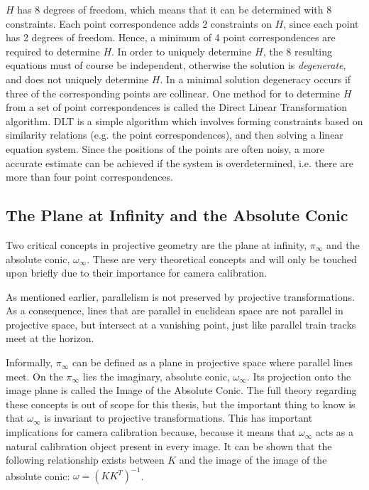 $H$ has 8 degrees of freedom, which means that it can be determined with 8 constraints. Each point correspondence adds 2 constraints on $H$, since each point has 2 degrees of freedom.
Hence, a minimum of 4 point correspondences are required to determine $H$.
In order to uniquely determine $H$, the 8 resulting equations must of course be independent, otherwise the solution is \textit{degenerate}, and does not uniquely determine $H$.
In a minimal solution degeneracy occurs if three of the corresponding points are collinear. \cite[91-92]{hartley-zisserman} %
One method for to determine $H$ from a set of point correspondences is called the Direct Linear Transformation algorithm.
DLT is a simple algorithm which involves forming constraints based on similarity relations (e.g. the point correspondences), and then solving a linear equation system.
Since the positions of the points are often noisy, a more accurate estimate can be achieved if the system is overdetermined, i.e. there are more than four point correspondences.
\cite{homography-estimation}

\subsection{The Plane at Infinity and the Absolute Conic} \label{ac}
Two critical concepts in projective geometry are the plane at infinity, $\pi_{\infty}$ and the absolute conic, $\omega_{\infty}$.
These are very theoretical concepts and will only be touched upon briefly due to their importance for camera calibration.

As mentioned earlier, parallelism is not preserved by projective transformations. %
As a consequence, lines that are parallel in euclidean space are not parallel in projective space, but intersect at a vanishing point, just like parallel train tracks meet at the horizon.

Informally, $\pi_{\infty}$ can be defined as a plane in projective space where parallel lines meet. 
On the $\pi_{\infty}$ lies the imaginary, absolute conic, $\omega_{\infty}$.
Its projection onto the image plane is called the Image of the Absolute Conic.
The full theory regarding these concepts is out of scope for this thesis, but the important thing to know is that $\omega_{\infty}$ is invariant to projective transformations.
This has important implications for camera calibration because, because it means that $\omega_{\infty}$ acts as a natural calibration object present in every image.
It can be shown that the following relationship exists between $K$ and the image of the image of the absolute conic:
$\omega = (KK^T)^{-1}$. \cite[210]{hartley-zisserman}\cite{pollefeys}

